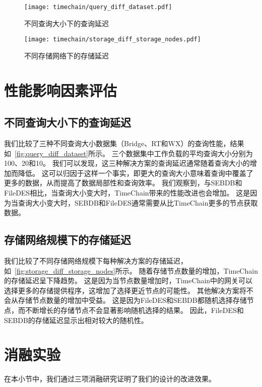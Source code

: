 \begin{figure}[t]
    \centering
	\begin{minipage}{0.45\linewidth}
        \centering
        \texttt{[image: timechain/query\_diff\_dataset.pdf]}
        \caption{不同查询大小下的查询延迟}
        \label{fig:query_diff_dataset}
	\end{minipage}
	\quad
	\begin{minipage}{0.45\linewidth}
        \centering
        \texttt{[image: timechain/storage\_diff\_storage\_nodes.pdf]}
        \caption{不同存储网络下的存储延迟}
        \label{fig:storage_diff_storage_nodes}
    \end{minipage}
\end{figure}

\section{性能影响因素评估}
\subsection{不同查询大小下的查询延迟}
我们比较了三种不同查询大小数据集（Bridge、RT和WX）的查询性能，结果如~\autoref{fig:query_diff_dataset}所示。
三个数据集中工作负载的平均查询大小分别为100、20和10。
我们可以发现，这三种解决方案的查询延迟通常随着查询大小的增加而降低。
这可以归因于这样一个事实，即更大的查询大小意味着查询中覆盖了更多的数据，从而提高了数据局部性和查询效率。
我们观察到，与SEBDB和FileDES相比，当查询大小变大时，TimeChain带来的性能改进也会增加。
这是因为当查询大小变大时，SEBDB和FileDES通常需要从比TimeChain更多的节点获取数据。

\subsection{存储网络规模下的存储延迟}
我们比较了不同存储网络规模下每种解决方案的存储延迟，如~\autoref{fig:storage_diff_storage_nodes}所示。
随着存储节点数量的增加，TimeChain的存储延迟呈下降趋势。
这是因为当节点数量增加时，TimeChain中的网关可以选择更多的存储提供程序，这增加了选择更近节点的可能性。
其他解决方案将不会从存储节点数量的增加中受益。
这是因为FileDES和SEBDB都随机选择存储节点，而不断增长的存储节点不会显著影响随机选择的结果。
因此，FileDES和SEBDB的存储延迟显示出相对较大的随机性。

\section{消融实验}
在本小节中，我们通过三项消融研究证明了我们的设计的改进效果。

